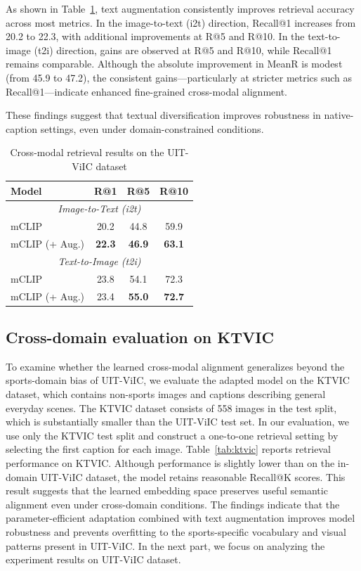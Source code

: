 As shown in Table~\ref{tab:uit}, text augmentation consistently improves retrieval accuracy across most metrics. In the image-to-text (i2t) direction, Recall@1 increases from 20.2 to 22.3, with additional improvements at R@5 and R@10. In the text-to-image (t2i) direction, gains are observed at R@5 and R@10, while Recall@1 remains comparable. Although the absolute improvement in MeanR is modest (from 45.9 to 47.2), the consistent gains—particularly at stricter metrics such as Recall@1—indicate enhanced fine-grained cross-modal alignment.

These findings suggest that textual diversification improves robustness in native-caption settings, even under domain-constrained conditions.

\begin{table}[ht]
\centering
\caption{Cross-modal retrieval results on the UIT-ViIC dataset}
\label{tab:uit}
\begin{tabular}{|l|c|c|c|}
\hline
\textbf{Model} & \textbf{R@1} & \textbf{R@5} & \textbf{R@10} \\
\hline
\multicolumn{4}{|c|}{\textit{Image-to-Text (i2t)}} \\
\hline
mCLIP & 20.2 & 44.8 & 59.9 \\
\hline
mCLIP (+ Aug.) & \textbf{22.3} & \textbf{46.9} & \textbf{63.1} \\
\hline
\multicolumn{4}{|c|}{\textit{Text-to-Image (t2i)}} \\
\hline
mCLIP & 23.8 & 54.1 & 72.3 \\
\hline
mCLIP (+ Aug.) & 23.4 & \textbf{55.0} & \textbf{72.7} \\
\hline
\end{tabular}
\end{table}

\subsection{Cross-domain evaluation on KTVIC}


To examine whether the learned cross-modal alignment generalizes beyond the sports-domain bias of UIT-ViIC, we evaluate the adapted model on the KTVIC dataset, which contains non-sports images and captions describing general everyday scenes. The KTVIC dataset consists of 558 images in the test split, which is substantially smaller than the UIT-ViIC test set. In our evaluation, we use only the KTVIC test split and construct a one-to-one retrieval setting by selecting the first caption for each image. Table~\ref{tab:ktvic} reports retrieval performance on KTVIC. Although performance is slightly lower than on the in-domain UIT-ViIC dataset, the model retains reasonable Recall@K scores. This result suggests that the learned embedding space preserves useful semantic alignment even under cross-domain conditions. The findings indicate that the parameter-efficient adaptation combined with text augmentation improves model robustness and prevents overfitting to the sports-specific vocabulary and visual patterns present in UIT-ViIC. In the next part, we focus on analyzing the experiment results on UIT-ViIC dataset. 

